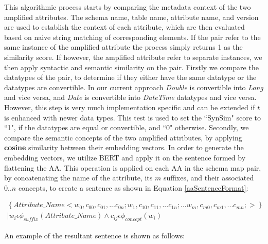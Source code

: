 This algorithmic process starts by comparing the metadata context of the two amplified attributes. The schema name, table name, attribute name, and version are used to establish the context of each attribute, which are then evaluated based on naive string matching of corresponding elements. If the pair refer to the same instance of the amplified attribute the process simply returns 1 as the similarity score. If however, the amplified attribute refer to separate instances, we then apply syntactic and semantic similarity on the pair. Firstly we compare the datatypes of the pair, to determine if they either have the same datatype or the datatypes are convertible. In our current approach \textit{Double} is convertible into \textit{Long} and vice versa, and \textit{Date} is convertible into \textit{DateTime} datatypes and vice versa. However, this step is very much implementation specific and can be extended if $t$ is enhanced with newer data types. This test is used to set the ``SynSim" score to ``1", if the datatypes are equal or convertible, and ``0" otherwise. Secondly, we compare the semantic concepts of the two amplified attributes, by applying \textbf{cosine} similarity between their embedding vectors. In order to generate the embedding vectors, we utilize {BERT} and apply it on the sentence formed by flattening the AA. This operation is applied on each AA in the schema map pair, by concatenating the name of the attribute, its $m$ suffixes, and their associated $0..n$ concepts, to create a sentence as shown in Equation \ref{aaSentenceFormat}:

\begin{equation}\label{aaSentenceFormat}
\begin{aligned}
\left \{ Attribute\_Name < w_0,c_{00},c_{01},...c_{0n}; w_1,c_{10},c_{11},...c_{1n};...w_m,c_{m0},c_{m1},...c_{mn};>\right \}\\
| w_i \epsilon \phi_{suffix}(Attribute\_Name) \wedge c_{ij} \epsilon \phi_{concept}(w_i) 
\end{aligned}
\end{equation}

An example of the resultant sentence is shown as follows:\\

\\

